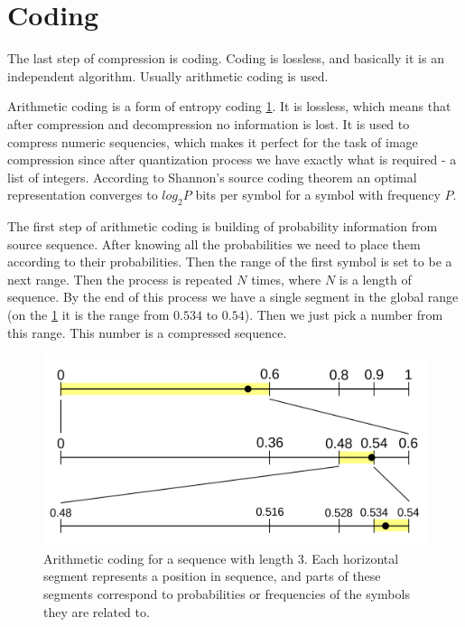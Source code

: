 \section{Coding}

The last step of compression is coding. Coding is lossless, and basically it is an independent algorithm. Usually arithmetic coding is used.

Arithmetic coding is a form of entropy coding \ref{arithmetic_coding}. It is lossless, which means that after compression and decompression no information is lost. It is used to compress numeric sequencies, which makes it perfect for the task of image compression since after quantization process we have exactly what is required - a list of integers. According to Shannon's source coding theorem an optimal representation converges to $log_2P$ bits per symbol for a symbol with frequency $P$.

The first step of arithmetic coding is building of probability information from source sequence. After knowing all the probabilities we need to place them according to their probabilities. Then the range of the first symbol is set to be a next range. Then the process is repeated $N$ times, where $N$ is a length of sequence. By the end of this process we have a single segment in the global range (on the \ref{arithmetic_coding} it is the range from $0.534$ to $0.54$). Then we just pick a number from this range. This number is a compressed sequence.

\begin{figure}[!ht]
    \centering
    \includegraphics[width=\textwidth]{figure/Arithmetic_encoding.svg.png}
    \caption{Arithmetic coding for a sequence with length 3. Each horizontal segment represents a position in sequence, and parts of these segments correspond to probabilities or frequencies of the symbols they are related to.}
    \label{arithmetic_coding}
\end{figure}

